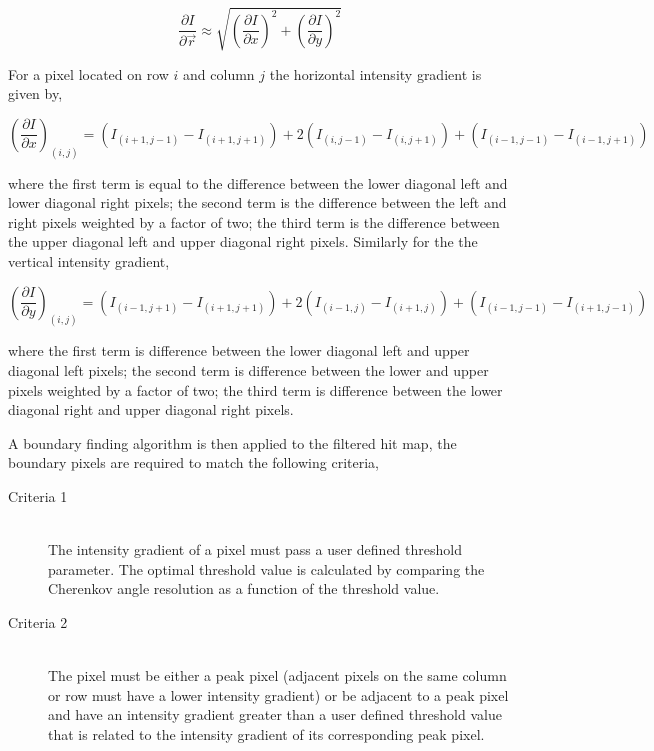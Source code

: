 \begin{equation}
	\frac{\partial I}{\partial \vec{r}} \approx \sqrt{\left(\frac{\partial I}{\partial x}\right)^2 + \left(\frac{\partial I}{\partial y}\right)^2}
\end{equation}

For a pixel located on row $i$ and column $j$ the horizontal intensity gradient is given by, 

\begin{equation}
	\left(\frac{\partial I}{\partial x}\right)_{(i,j)} = (I_{(i+1,j-1)} - I_{(i+1, j+1)}) + 2(I_{(i,j-1)} - I_{(i, j+1)}) + (I_{(i-1,j-1)} - I_{(i-1, j+1)})
\end{equation}

where the first term is equal to the difference between the lower diagonal left and lower diagonal right pixels; the second term is the difference between the left and right pixels weighted by a factor of two; the third term is the difference between the upper diagonal left and upper diagonal right pixels. Similarly for the the vertical intensity gradient,

\begin{equation}
	\left(\frac{\partial I}{\partial y}\right)_{(i,j)} = (I_{(i-1,j+1)} - I_{(i+1, j+1)}) + 2(I_{(i-1,j)} - I_{(i+1, j)}) + (I_{(i-1,j-1)} - I_{(i+1, j-1)})
\end{equation}

where the first term is difference between the lower diagonal left and upper diagonal left pixels; the second term is difference between the lower and upper pixels weighted by a factor of two; the third term is difference between the lower diagonal right and upper diagonal right pixels.

A boundary finding algorithm is then applied to the filtered hit map, the boundary pixels are required to match the following criteria,

\begin{description}
	\item[Criteria 1] \hfill \\ The intensity gradient of a pixel must pass a user defined threshold parameter. The optimal threshold value is calculated by comparing the Cherenkov angle resolution as a function of the threshold value.
	\item[Criteria 2]\hfill \\ The pixel must be either a peak pixel (adjacent pixels on the same column or row must have a lower intensity gradient) or be adjacent to a peak pixel and have an intensity gradient greater than a user defined threshold value that is related to the intensity gradient of its corresponding peak pixel.
\end{description}

